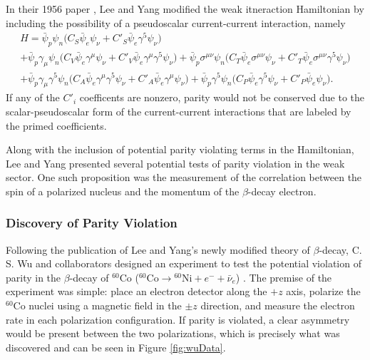 In their 1956 paper \cite{leeyang1956}, Lee and Yang modified the weak itneraction Hamiltonian
by including the possibility of a pseudoscalar current-current interaction, namely
%
\begin{multline}
  H = \bar{\psi}_p \psi_n \big( C_S\bar{\psi}_e  \psi_\nu + C'_S\bar{\psi}_e \gamma^5 \psi_\nu \big) \\
  + \bar{\psi}_p \gamma_\mu \psi_n  \big( C_V\bar{\psi}_e \gamma^\mu \psi_\nu + C'_V\bar{\psi}_e \gamma^\mu \gamma^5 \psi_\nu \big) 
  + \bar{\psi}_p \sigma^{\mu\nu} \psi_n \big( C_T\bar{\psi}_e \sigma^{\mu\nu} \psi_\nu + C'_T\bar{\psi}_e \sigma^{\mu\nu} \gamma^5 \psi_\nu \big)\\
  + \bar{\psi}_p \gamma_\mu \gamma^5 \psi_n \big( C_A\bar{\psi}_e \gamma^\mu \gamma^5 \psi_\nu + C'_A\bar{\psi}_e \gamma^\mu \psi_\nu \big) 
  + \bar{\psi}_p  \gamma^5 \psi_n \big( C_P\bar{\psi}_e  \gamma^5 \psi_\nu + C'_P\bar{\psi}_e \psi_\nu \big).
  \label{eq:leeyang}
\end{multline}
%
If any of the $C'_i$ coefficents are nonzero, parity would not be conserved due to
the scalar-pseudoscalar form of the current-current interactions that are labeled by
the primed coefficients.

Along with the inclusion of potential parity violating terms in the Hamiltonian, Lee and Yang
presented several potential tests of parity violation in the weak sector. One such proposition
was the measurement of the correlation between the spin of a polarized nucleus and
the momentum of the $\beta$-decay electron.

\subsubsection{Discovery of Parity Violation}

Following the publication of Lee and Yang's newly modified theory of $\beta$-decay, C. S. Wu
and collaborators designed an experiment to test the potential violation
of parity in the $\beta$-decay of $^{60}\mathrm{Co}$
($^{60}\mathrm{Co} \rightarrow {^{60}\mathrm{Ni}} + e^- + \bar{\nu}_e$) \cite{wu1957}. The premise of the experiment
was simple: place an electron detector along the $+z$ axis, polarize the $^{60}\mathrm{Co}$ nuclei
using a magnetic field in the $\pm z$ direction, and measure the electron rate in each polarization
configuration. If parity is violated, a clear asymmetry would be present between the two polarizations,
which is precisely what was discovered and can be seen in Figure \ref{fig:wuData}.

